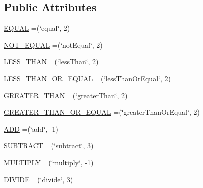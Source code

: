 \subsection*{Public Attributes}
\begin{DoxyCompactItemize}
\item 
\hyperlink{enumorg_1_1semanticweb_1_1owlapi_1_1vocab_1_1_s_w_r_l_built_ins_vocabulary_a8ccb142770a978df58456f6f093c9687}{E\-Q\-U\-A\-L} =(\char`\"{}equal\char`\"{}, 2)
\item 
\hyperlink{enumorg_1_1semanticweb_1_1owlapi_1_1vocab_1_1_s_w_r_l_built_ins_vocabulary_a4ace5a915bc2a2928ffd4fd9f939ccc5}{N\-O\-T\-\_\-\-E\-Q\-U\-A\-L} =(\char`\"{}not\-Equal\char`\"{}, 2)
\item 
\hyperlink{enumorg_1_1semanticweb_1_1owlapi_1_1vocab_1_1_s_w_r_l_built_ins_vocabulary_ab226cffb32c5c7629bdad18615708718}{L\-E\-S\-S\-\_\-\-T\-H\-A\-N} =(\char`\"{}less\-Than\char`\"{}, 2)
\item 
\hyperlink{enumorg_1_1semanticweb_1_1owlapi_1_1vocab_1_1_s_w_r_l_built_ins_vocabulary_a41b8e190bb32ee611a5f940d4d75ee1b}{L\-E\-S\-S\-\_\-\-T\-H\-A\-N\-\_\-\-O\-R\-\_\-\-E\-Q\-U\-A\-L} =(\char`\"{}less\-Than\-Or\-Equal\char`\"{}, 2)
\item 
\hyperlink{enumorg_1_1semanticweb_1_1owlapi_1_1vocab_1_1_s_w_r_l_built_ins_vocabulary_ab4c1be922bf2edd0790c54303d1ba422}{G\-R\-E\-A\-T\-E\-R\-\_\-\-T\-H\-A\-N} =(\char`\"{}greater\-Than\char`\"{}, 2)
\item 
\hyperlink{enumorg_1_1semanticweb_1_1owlapi_1_1vocab_1_1_s_w_r_l_built_ins_vocabulary_a95dbffe6ba8754d890992e20c78556bb}{G\-R\-E\-A\-T\-E\-R\-\_\-\-T\-H\-A\-N\-\_\-\-O\-R\-\_\-\-E\-Q\-U\-A\-L} =(\char`\"{}greater\-Than\-Or\-Equal\char`\"{}, 2)
\item 
\hyperlink{enumorg_1_1semanticweb_1_1owlapi_1_1vocab_1_1_s_w_r_l_built_ins_vocabulary_a2c6e8cc6d4712e66a95a8824124739e2}{A\-D\-D} =(\char`\"{}add\char`\"{}, -\/1)
\item 
\hyperlink{enumorg_1_1semanticweb_1_1owlapi_1_1vocab_1_1_s_w_r_l_built_ins_vocabulary_ae2de2e15be85beac3f184cc009688242}{S\-U\-B\-T\-R\-A\-C\-T} =(\char`\"{}subtract\char`\"{}, 3)
\item 
\hyperlink{enumorg_1_1semanticweb_1_1owlapi_1_1vocab_1_1_s_w_r_l_built_ins_vocabulary_af482b1ab47b0680b8446ab6b4a47e7f7}{M\-U\-L\-T\-I\-P\-L\-Y} =(\char`\"{}multiply\char`\"{}, -\/1)
\item 
\hyperlink{enumorg_1_1semanticweb_1_1owlapi_1_1vocab_1_1_s_w_r_l_built_ins_vocabulary_a9e2505f3a64ca3f34d128fcb11367410}{D\-I\-V\-I\-D\-E} =(\char`\"{}divide\char`\"{}, 3)

\end{DoxyCompactItemize}
